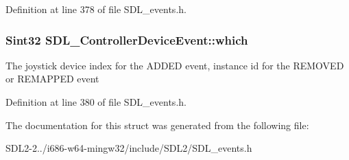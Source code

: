 Definition at line 378 of file S\+D\+L\+\_\+events.\+h.

\hypertarget{structSDL__ControllerDeviceEvent_accb80de1619c1e790cffb6c888c915db}{
\subsubsection[{which}]{\setlength{\rightskip}{0pt plus 5cm}Sint32 S\+D\+L\+\_\+\+Controller\+Device\+Event\+::which}}\label{structSDL__ControllerDeviceEvent_accb80de1619c1e790cffb6c888c915db}
The joystick device index for the A\+D\+D\+E\+D event, instance id for the R\+E\+M\+O\+V\+E\+D or R\+E\+M\+A\+P\+P\+E\+D event 

Definition at line 380 of file S\+D\+L\+\_\+events.\+h.



The documentation for this struct was generated from the following file\+:\begin{DoxyCompactItemize}
\item 
S\+D\+L2-\/2../i686-\/w64-\/mingw32/include/\+S\+D\+L2/S\+D\+L\+\_\+events.\+h\end{DoxyCompactItemize}
